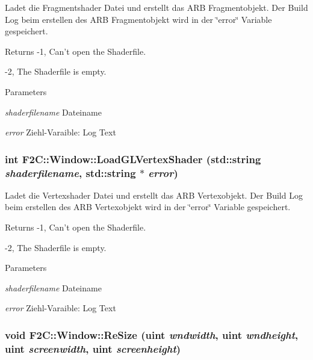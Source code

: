Ladet die Fragmentshader Datei und erstellt das ARB Fragmentobjekt. Der Build Log beim erstellen des ARB Fragmentobjekt wird in der \char`\"{}error\char`\"{} Variable gespeichert. \begin{DoxyReturn}{Returns}
-\/1, Can't open the Shaderfile. 

-\/2, The Shaderfile is empty. 
\end{DoxyReturn}

\begin{DoxyParams}{Parameters}
\item[{\em shaderfilename}]Dateiname \item[{\em error}]Ziehl-\/Varaible: Log Text \end{DoxyParams}
\hypertarget{class_f2_c_1_1_window_aa2b637446b9c4e8e9e93001e32945ae4}{
\subsubsection[{LoadGLVertexShader}]{\setlength{\rightskip}{0pt plus 5cm}int F2C::Window::LoadGLVertexShader (std::string {\em shaderfilename}, \/  std::string $\ast$ {\em error})}}
\label{class_f2_c_1_1_window_aa2b637446b9c4e8e9e93001e32945ae4}


Ladet die Vertexshader Datei und erstellt das ARB Vertexobjekt. Der Build Log beim erstellen des ARB Vertexobjekt wird in der \char`\"{}error\char`\"{} Variable gespeichert. \begin{DoxyReturn}{Returns}
-\/1, Can't open the Shaderfile. 

-\/2, The Shaderfile is empty. 
\end{DoxyReturn}

\begin{DoxyParams}{Parameters}
\item[{\em shaderfilename}]Dateiname \item[{\em error}]Ziehl-\/Varaible: Log Text \end{DoxyParams}
\hypertarget{class_f2_c_1_1_window_a018c40b68699cc3202cb6e29b2c22747}{
\subsubsection[{ReSize}]{\setlength{\rightskip}{0pt plus 5cm}void F2C::Window::ReSize ({\bf uint} {\em wndwidth}, \/  {\bf uint} {\em wndheight}, \/  {\bf uint} {\em screenwidth}, \/  {\bf uint} {\em screenheight})}}
\label{class_f2_c_1_1_window_a018c40b68699cc3202cb6e29b2c22747}


